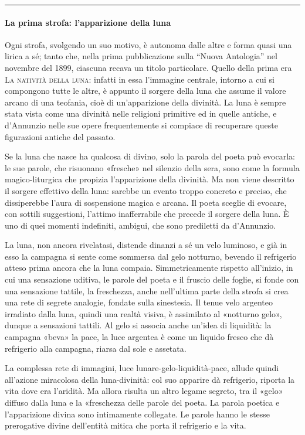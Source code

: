 \documentclass{book}
\newcommand{\finepoesia}{\vspace*{1em}\hrule\vspace*{1em}}
\begin{document}
\finepoesia

\paragraph{La prima strofa: l'apparizione della luna} Ogni strofa, svolgendo un suo motivo, è autonoma dalle altre e forma quasi una lirica a sé; tanto che, nella prima pubblicazione sulla “Nuova Antologia” nel novembre del 1899, ciascuna recava un titolo particolare. Quello della prima era \textsc{La natività della luna}: infatti in essa l'immagine centrale, intorno a cui si compongono tutte le altre, è appunto il sorgere della luna che assume il valore arcano di una teofania, cioè di un'apparizione della divinità. La luna è sempre stata vista come una divinità nelle religioni primitive ed in quelle antiche, e d'Annunzio nelle sue opere frequentemente si compiace di recuperare queste figurazioni antiche del passato.

Se la luna che nasce ha qualcosa di divino, solo la parola del poeta può evocarla: le sue parole, che risuonano «fresche» nel silenzio della sera, sono come la formula magico-liturgica che propizia l'apparizione della divinità. Ma non viene descritto il sorgere effettivo della luna: sarebbe un evento troppo concreto e preciso, che dissiperebbe l'aura di sospensione magica e arcana. Il poeta sceglie di evocare, con sottili suggestioni, l'attimo inafferrabile che precede il sorgere della luna. È uno di quei momenti indefiniti, ambigui, che sono prediletti da d'Annunzio.

La luna, non ancora rivelatasi, distende dinanzi a sé un velo luminoso, e già in esso la campagna si sente come sommersa dal gelo notturno, bevendo il refrigerio atteso prima ancora che la luna compaia. Simmetricamente rispetto all'inizio, in cui una sensazione uditiva, le parole del poeta e il fruscio delle foglie, si fonde con una sensazione tattile, la freschezza, anche nell'ultima parte della strofa si crea una rete di segrete analogie, fondate sulla sinestesia. Il tenue velo argenteo irradiato dalla luna, quindi una realtà visiva, è assimilato al «notturno gelo», dunque a sensazioni tattili. Al gelo si associa anche un'idea di liquidità: la campagna «beva» la pace, la luce argentea è come un liquido fresco che dà refrigerio alla campagna, riarsa dal sole e assetata.

La complessa rete di immagini, luce lunare-gelo-liquidità-pace, allude quindi all'azione miracolosa della luna-divinità: col suo apparire dà refrigerio, riporta la vita dove era l'aridità. Ma allora risulta un altro legame segreto, tra il «gelo» diffuso dalla luna e la «freschezza delle parole del poeta. La parola poetica e l'apparizione divina sono intimamente collegate. Le parole hanno le stesse prerogative divine dell'entità mitica che porta il refrigerio e la vita.
\end{document}
